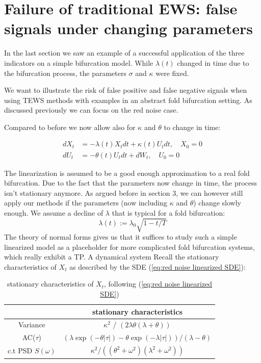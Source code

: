 \documentclass[%
thesis=student,%
coverpage=false,%
titlepage=false,%
headmarks=true, %
english,%
font=libertine, %
math=newpxtx, %
BCOR=5mm,%
coverBCOR=11mm%
]{tumbook}
\begin{document}
\chapter{Failure of traditional EWS: false signals  under changing parameters}

In the last section we saw an example of a successful application of the three indicators on a simple bifurcation model. While $\lambda(t)$ changed in time due to the bifurcation process, the parameters $\sigma$ and $\kappa$ were fixed. 

We want to illustrate the risk of false positive and false negative signals when using TEWS methods with examples in an abstract fold bifurcation setting. As discussed previously we can focus on the red noise case.

Compared to before we now allow also for $\kappa$ and $\theta$ to change in time:

    \begin{equation}
    \begin{aligned}
        dX_{t} &= -\lambda(t) X_{t}dt + \kappa(t) U_{t}dt, \quad X_{0} = 0 \\
        dU_{t} &= -\theta(t) U_{t}dt + dW_{t}, \quad U_{0} = 0
    \end{aligned}
    \label{failure of TEWS SDE}
    \end{equation}

The linearization is assumed to be a good enough approximation to a real fold bifurcation. Due to the fact that the parameters now change in time, the process isn't stationary anymore. As argued before in section 3, we can however still apply our methods if the parameters (now including $\kappa$ and $\theta$) change slowly enough.
We assume a decline of $\lambda$ that is typical for a fold bifurcation: 
    \[
    \lambda(t) := \lambda_{0}\sqrt{1-t/T}
    \]
The theory of normal forms gives us that it suffices to study such a simple linearized model as a placeholder for more complicated fold bifurcation systems, which really exhibit a TP. A dynamical system 
Recall the stationary characteristics of $X_{t}$ as described by the SDE (\ref{eq:red noise linearized SDE}): 

\begin{table}[h!]
\centering
\begin{tabular}{|c|c|}
\hline
& stationary characteristics\\
\hline
Variance & $\kappa^2$ / $(2\lambda\theta(\lambda + \theta))$\\
AC($\tau$) & $(\lambda\exp(-\theta\lvert\tau\rvert)-\theta\exp(-\lambda\lvert\tau\rvert))/(\lambda - \theta)$\\
c.t PSD $S(\omega)$ & $\kappa^2/((\theta^2 + \omega^2)(\lambda^2 + \omega^2))$\\
\hline
\end{tabular}
\caption{stationary characteristics of $X_{t}$, following (\ref{eq:red noise linearized SDE})}
\label{tab:simple_table}
\end{table}
\end{document}
